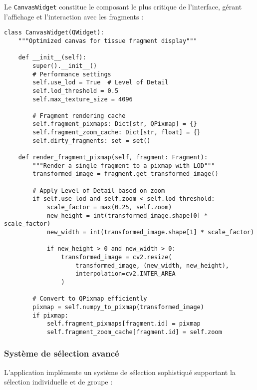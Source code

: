 \documentclass[12pt,a4paper]{report}
\begin{document}
Le \texttt{CanvasWidget} constitue le composant le plus critique de l'interface, gérant l'affichage et l'interaction avec les fragments :

\begin{lstlisting}[caption=Optimisations de rendu du CanvasWidget]
class CanvasWidget(QWidget):
    """Optimized canvas for tissue fragment display"""
    
    def __init__(self):
        super().__init__()
        # Performance settings
        self.use_lod = True  # Level of Detail
        self.lod_threshold = 0.5
        self.max_texture_size = 4096
        
        # Fragment rendering cache
        self.fragment_pixmaps: Dict[str, QPixmap] = {}
        self.fragment_zoom_cache: Dict[str, float] = {}
        self.dirty_fragments: set = set()
    
    def render_fragment_pixmap(self, fragment: Fragment):
        """Render a single fragment to a pixmap with LOD"""
        transformed_image = fragment.get_transformed_image()
        
        # Apply Level of Detail based on zoom
        if self.use_lod and self.zoom < self.lod_threshold:
            scale_factor = max(0.25, self.zoom)
            new_height = int(transformed_image.shape[0] * scale_factor)
            new_width = int(transformed_image.shape[1] * scale_factor)
            
            if new_height > 0 and new_width > 0:
                transformed_image = cv2.resize(
                    transformed_image, (new_width, new_height),
                    interpolation=cv2.INTER_AREA
                )
        
        # Convert to QPixmap efficiently
        pixmap = self.numpy_to_pixmap(transformed_image)
        if pixmap:
            self.fragment_pixmaps[fragment.id] = pixmap
            self.fragment_zoom_cache[fragment.id] = self.zoom
\end{lstlisting}

\subsubsection{Système de sélection avancé}

L'application implémente un système de sélection sophistiqué supportant la sélection individuelle et de groupe :
\end{document}
